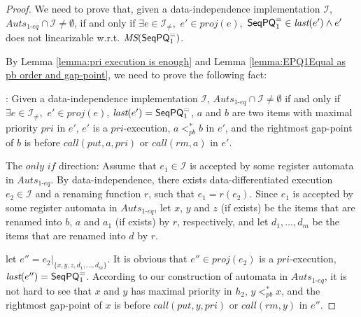 \begin {proof}

We need to prove that, given a data-independence implementation $\mathcal{I}$, $\textit{Auts}_{\textit{1-eq}} \cap \mathcal{I} \neq \emptyset$, if and only if $\exists e \in \mathcal{I}_{\neq},$ $e' \in \textit{proj}(e),$ $\mathsf{SeqPQ}_1^{=} \in \textit{last}(e') \wedge e'$ does not linearizable w.r.t. $\textit{MS}(\mathsf{SeqPQ}_1^{=})$.

By Lemma \ref{lemma:pri execution is enough} and Lemma \ref{lemma:EPQ1Equal as pb order and gap-point}, we need to prove the following fact:

: Given a data-independence implementation $\mathcal{I}$, $\textit{Auts}_{\textit{1-eq}} \cap \mathcal{I} \neq \emptyset$ if and only if $\exists e \in \mathcal{I}_{\neq},$ $e' \in \textit{proj}(e)$, $\textit{last}(e')=\mathsf{SeqPQ}_1^{=}$, $a$ and $b$ are two items with maximal priority $\textit{pri}$ in $e'$, $e'$ is a $\textit{pri}$-execution, $a <_{\textit{pb}}^* b$ in $e'$, and the rightmost gap-point of $b$ is before $\textit{call}(\textit{put},a,\textit{pri})$ or $\textit{call}(\textit{rm},a)$ in $e'$.

\noindent The $\textit{only if}$ direction: Assume that $e_1 \in \mathcal{I}$ is accepted by some register automata in $\textit{Auts}_{\textit{1-eq}}$. By data-independence, there exists data-differentiated execution $e_2 \in \mathcal{I}$ and a renaming function $r$, such that $e_1=r(e_2)$. Since $e_1$ is accepted by some register automata in  $\textit{Auts}_{\textit{1-eq}}$, let $x$, $y$ and $z$ (if exists) be the items that are renamed into $b$, $a$ and $a_1$ (if exists) by $r$, respectively, and let $d_1,\ldots,d_m$ be the items that are renamed into $d$ by $r$.

let $e'' = e_2 \vert_{ \{ x,y,z,d_1,\ldots,d_m \} }$. It is obvious that $e'' \in \textit{proj}(e_2)$ is a $\textit{pri}$-execution, $\textit{last}(e'') = \mathsf{SeqPQ}_1^{=}$. According to our construction of automata in $\textit{Auts}_{\textit{1-eq}}$, it is not hard to see that $x$ and $y$ has maximal priority in $h_2$, $y <_{\textit{pb}}^* x$, and the rightmost gap-point of $x$ is before $\textit{call}(\textit{put},y,\textit{pri})$ or $\textit{call}(\textit{rm},y)$ in $e''$.


\end{proof}
